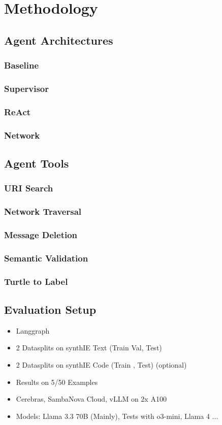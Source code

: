 \documentclass[a4paper,oneside,bibliography=totoc]{scrbook}
\begin{document}

\chapter{Methodology}
\section{Agent Architectures}
\subsection{Baseline}
\subsection{Supervisor}
\subsection{ReAct}
\subsection{Network}

\section{Agent Tools}
\subsection{URI Search}
\subsection{Network Traversal}
\subsection{Message Deletion}
\subsection{Semantic Validation}
\subsection{Turtle to Label}
\section{Evaluation Setup}
\begin{itemize}
  \item Langgraph
  \item 2 Datasplits on synthIE Text (Train Val, Test)
  \item 2 Datasplits on synthIE Code (Train , Test) (optional)
  \item Results on 5/50 Examples
  \item Cerebras, SambaNova Cloud, vLLM on 2x A100
  \item Models: Llama 3.3 70B (Mainly), Tests with o3-mini, Llama 4 ...
\end{itemize}
\end{document}
